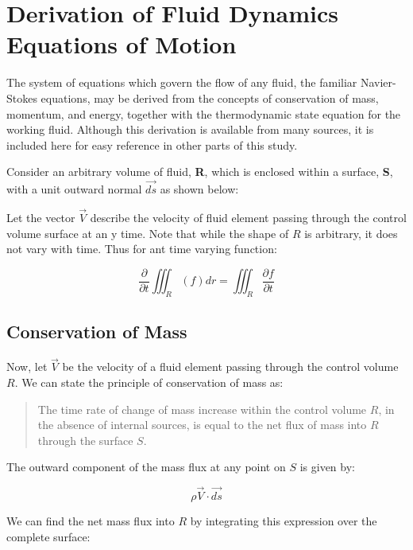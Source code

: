 \section{Derivation of Fluid Dynamics Equations of Motion}

The  system of equations which govern the flow of any fluid, the familiar
Navier-Stokes equations, may be derived from the concepts of conservation of
mass, momentum, and energy, together with the thermodynamic state equation for
the working fluid. Although this derivation is available from many sources, it
is included here for easy reference in other parts of this study.

Consider an arbitrary volume of fluid, {\bf R}, which is enclosed within a
surface, {\bf S}, with a unit outward normal {$\overrightarrow{ds}$} as shown
below:


Let the vector {$\overrightarrow{V}$} describe the velocity of fluid element
passing through the control volume surface at an y time. Note that while the
shape of $R$ is arbitrary, it does not vary with time. Thus for ant time
varying function:

\begin{equation}
\frac{\partial}{\partial t} \iiint_R (f) dr = \iiint_R \frac{\partial f}{\partial t}
\end{equation}

\subsection{Conservation of Mass}

Now, let $\overrightarrow{V}$ be the velocity of a fluid element passing
through the control volume $R$. We can state the principle of conservation of
mass as:

\begin{quote}
The time rate of change of mass increase within the control volume $R$, in
the absence of internal sources, is equal to the net flux of mass into $R$
through the surface $S$.
\end{quote}

The outward component of the mass flux at any point on $S$ is given by:

\begin{equation}
\rho \overrightarrow{V} \cdot \overrightarrow{ds}
\end{equation}

We can find the net mass flux into $R$ by integrating this expression over the
complete surface:

